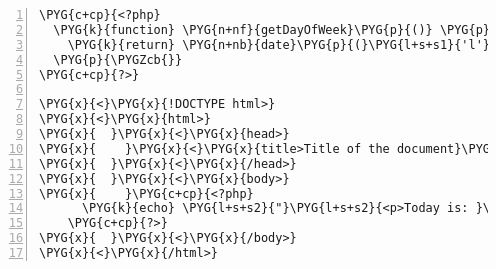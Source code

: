 \begin{Verbatim}[commandchars=\\\{\},numbers=left,stepnumber=1,codes={\catcode`\$=3\catcode`\^=7\catcode`\_=8}]
\PYG{c+cp}{<?php}
  \PYG{k}{function} \PYG{n+nf}{getDayOfWeek}\PYG{p}{()} \PYG{p}{\PYGZob{}}
    \PYG{k}{return} \PYG{n+nb}{date}\PYG{p}{(}\PYG{l+s+s1}{'l'}\PYG{p}{);}
  \PYG{p}{\PYGZcb{}}
\PYG{c+cp}{?>}

\PYG{x}{<}\PYG{x}{!DOCTYPE html>}
\PYG{x}{<}\PYG{x}{html>}
\PYG{x}{  }\PYG{x}{<}\PYG{x}{head>}
\PYG{x}{    }\PYG{x}{<}\PYG{x}{title>Title of the document}\PYG{x}{<}\PYG{x}{/title>}
\PYG{x}{  }\PYG{x}{<}\PYG{x}{/head>}
\PYG{x}{  }\PYG{x}{<}\PYG{x}{body>}
\PYG{x}{    }\PYG{c+cp}{<?php}
      \PYG{k}{echo} \PYG{l+s+s2}{"}\PYG{l+s+s2}{<p>Today is: }\PYG{l+s+s2}{"} \PYG{o}{.} \PYG{n+nx}{getDayOfWeek}\PYG{p}{()} \PYG{o}{.} \PYG{l+s+s2}{"}\PYG{l+s+s2}{</p>}\PYG{l+s+se}{\PYGZbs{}n}\PYG{l+s+s2}{"}\PYG{p}{;}
    \PYG{c+cp}{?>}
\PYG{x}{  }\PYG{x}{<}\PYG{x}{/body>}
\PYG{x}{<}\PYG{x}{/html>}
\end{Verbatim}

